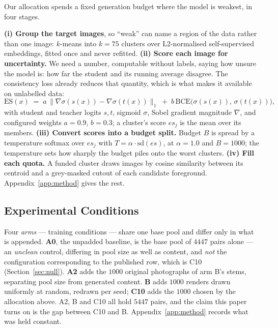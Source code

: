 \documentclass{article} %
\begin{document}
Our allocation spends a fixed generation budget where the model is weakest, in four stages.

\textbf{(i) Group the target images}, so ``weak'' can name a region of the data rather than one
image: $k$-means into $k=75$ clusters over L2-normalised self-supervised embeddings, fitted once and
never refitted. \textbf{(ii) Score each image for uncertainty.} We need a number, computable without
labels, saying how unsure the model is: how far the student and its running average disagree. The
consistency loss already reduces that quantity, which is what makes it available on unlabelled
data:
\begin{equation}
\mathrm{ES}(x) \;=\; a \,\big\| \nabla \sigma(s(x)) - \nabla \sigma(t(x)) \big\|_{1}
\;+\; b \, \mathrm{BCE}\big( \sigma(s(x)),\, \sigma(t(x)) \big),
\label{eq:es}
\end{equation}
with student and teacher logits $s,t$, sigmoid $\sigma$, Sobel gradient magnitude $\nabla$, and
configured weights $a=0.9$, $b=0.3$; a cluster's score $\mathit{es}_j$ is the mean over its
members. \textbf{(iii) Convert scores into a budget split.} Budget $B$ is spread by a temperature
softmax over $\mathit{es}_j$ with $T = \alpha \cdot \mathrm{sd}(\mathit{es})$, at $\alpha = 1.0$ and
$B = 1000$; the temperature sets how sharply the budget piles onto the worst clusters.
\textbf{(iv) Fill each quota.} A funded cluster draws images by cosine similarity between its
centroid and a grey-masked cutout of each candidate foreground. Appendix~\ref{app:method} gives the
rest.

\subsection{Experimental Conditions}
\label{sec:method-arms}

Four \emph{arms} --- training conditions --- share one base pool and differ only in what is
appended. \textbf{A0}, the unpadded baseline, is the base pool of $4447$ pairs alone --- an
\emph{unclean} control, differing in pool size as well as content, and \emph{not} the configuration
corresponding to the published row, which is C10 (Section~\ref{sec:null}). \textbf{A2} adds the $1000$ original photographs of arm B's stems, separating pool size from
generated content. \textbf{B} adds $1000$ renders drawn uniformly at random, redrawn per seed;
\textbf{C10} adds the $1000$ chosen by the allocation above. A2, B and C10 all hold $5447$ pairs, and the claim this paper
turns on is the gap between C10 and B. Appendix~\ref{app:method} records what was held constant.
\end{document}
